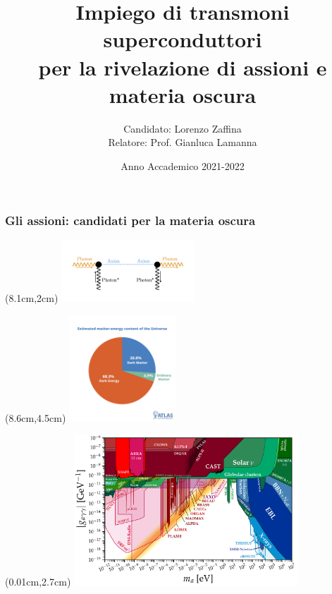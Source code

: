 \documentclass[10pt]{beamer}
\title[Università di Pisa]{Impiego di transmoni superconduttori\\
per la rivelazione
di assioni e materia oscura}
\author[Lorenzo Zaffina]{Candidato: Lorenzo Zaffina\\ Relatore: Prof. Gianluca Lamanna}
\institute[]{Università di Pisa\\
Dipartimento di Fisica "Enrico Fermi"}
\date[\textcolor{white}{15 settembre 2022} ]{Anno Accademico 2021-2022}
\begin{document}
\frame{\titlepage}
\begin{frame}
\frametitle{Gli assioni: candidati per la materia oscura}



\begin{textblock*}{5cm}(8.1cm,2cm) %
\includegraphics[width=5cm]{img1/axion_photon.jpg}
\end{textblock*}

\begin{textblock*}{4cm}(8.6cm,4.5cm) %
\includegraphics[width=4cm]{img1/pie_chart_DM.png}
\end{textblock*}

\begin{textblock*}{9cm}(0.01cm,2.7cm) %
\includegraphics[width=8.4cm]{img1/AxionPhoton_with_Projections.pdf}
\end{textblock*}



\end{frame}
\end{document}
